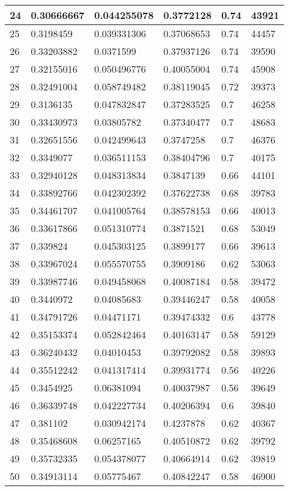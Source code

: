 \begin{longtable}{|l|l|l|l|l|l|}
24 & 0.30666667 & 0.044255078 & 0.3772128 & 0.74 & 43921 \\ \hline 
25 & 0.3198459 & 0.039331306 & 0.37068653 & 0.74 & 44457 \\ \hline 
26 & 0.33203882 & 0.0371599 & 0.37937126 & 0.74 & 39590 \\ \hline 
27 & 0.32155016 & 0.050496776 & 0.40055004 & 0.74 & 45908 \\ \hline 
28 & 0.32491004 & 0.058749482 & 0.38119045 & 0.72 & 39373 \\ \hline 
29 & 0.3136135 & 0.047832847 & 0.37283525 & 0.7 & 46258 \\ \hline 
30 & 0.33430973 & 0.03805782 & 0.37340477 & 0.7 & 48683 \\ \hline 
31 & 0.32651556 & 0.042499643 & 0.3747258 & 0.7 & 46376 \\ \hline 
32 & 0.3349077 & 0.036511153 & 0.38404796 & 0.7 & 40175 \\ \hline 
33 & 0.32940128 & 0.048313834 & 0.3847139 & 0.66 & 44101 \\ \hline 
34 & 0.33892766 & 0.042302392 & 0.37622738 & 0.68 & 39783 \\ \hline 
35 & 0.34461707 & 0.041005764 & 0.38578153 & 0.66 & 40013 \\ \hline 
36 & 0.33617866 & 0.051310774 & 0.3871521 & 0.68 & 53049 \\ \hline 
37 & 0.339824 & 0.045303125 & 0.3899177 & 0.66 & 39613 \\ \hline 
38 & 0.33967024 & 0.055570755 & 0.3909186 & 0.62 & 53063 \\ \hline 
39 & 0.33987746 & 0.049458068 & 0.40087184 & 0.58 & 39472 \\ \hline 
40 & 0.3440972 & 0.04085683 & 0.39446247 & 0.58 & 40058 \\ \hline 
41 & 0.34791726 & 0.04471171 & 0.39474332 & 0.6 & 43778 \\ \hline 
42 & 0.35153374 & 0.052842464 & 0.40163147 & 0.58 & 59129 \\ \hline 
43 & 0.36240432 & 0.04010453 & 0.39792082 & 0.58 & 39893 \\ \hline 
44 & 0.35512242 & 0.041317414 & 0.39931774 & 0.56 & 40226 \\ \hline 
45 & 0.3454925 & 0.06381094 & 0.40037987 & 0.56 & 39649 \\ \hline 
46 & 0.36339748 & 0.042227734 & 0.40206394 & 0.6 & 39840 \\ \hline 
47 & 0.381102 & 0.030942174 & 0.4237878 & 0.62 & 40367 \\ \hline 
48 & 0.35468608 & 0.06257165 & 0.40510872 & 0.62 & 39792 \\ \hline 
49 & 0.35732335 & 0.054378077 & 0.40664914 & 0.62 & 39819 \\ \hline 
50 & 0.34913114 & 0.05775467 & 0.40842247 & 0.58 & 46900 \\ \hline 
\end{longtable}